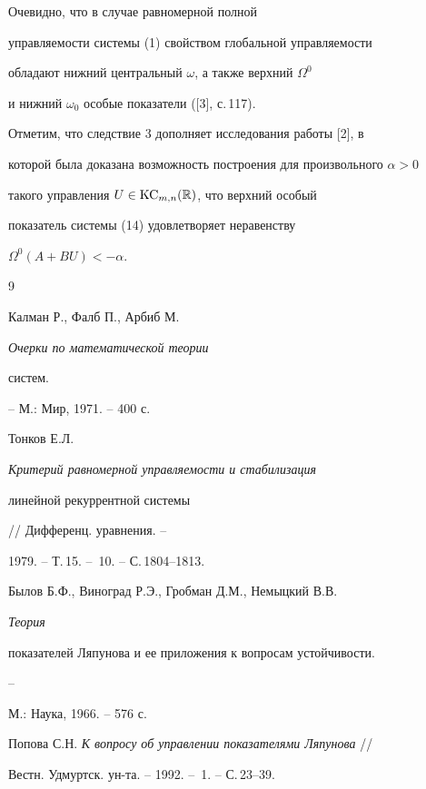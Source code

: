 \begin{note} Очевидно, что в случае равномерной полной


управляемости системы (1) свойством глобальной управляемости


обладают нижний центральный $\omega$, а также верхний $\Omega^{0}$


и нижний $\omega_{0} $ особые показатели ([3], с.\,117).


Отметим, что следствие 3 дополняет исследования работы [2], в


которой была доказана возможность построения для произвольного $\alpha>0$


такого управления $U\in\operatorname{KC}_{m,n}(\Bbb R)$, что верхний особый


показатель системы (14) удовлетворяет неравенству


$\Omega^{0}(A+BU)<-\alpha$.


\end{note}





\begin{thebibliography}{9}







Калман Р., Фалб П., Арбиб М. {\em Очерки по математической теории


систем.} -- М.: Мир, 1971. -- 400 с.




Тонков Е.Л. {\em Критерий равномерной управляемости и стабилизация


линейной рекуррентной системы} // Дифференц. уравнения. --


1979. -- Т.\,15. -- \No\,10. -- С.\,1804--1813.




Былов Б.Ф., Виноград Р.Э., Гробман Д.М., Немыцкий В.В. {\em Теория


показателей Ляпунова и ее приложения к вопросам устойчивости.} --


М.: Наука, 1966. -- 576 с.




Попова С.Н. {\em К вопросу об управлении показателями Ляпунова} //


Вестн. Удмуртск. ун-та. -- 1992. -- \No\,1. -- С.\,23--39.





\end{thebibliography}





\vskip 0.5cm









\medskip







\label{end}





